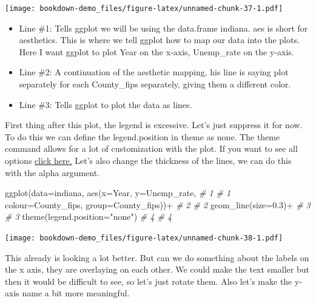 \documentclass[
]{book}
\newenvironment{Shaded}{\begin{snugshade}}{\end{snugshade}}
\newcommand{\AttributeTok}[1]{\textcolor[rgb]{0.77,0.63,0.00}{#1}}
\newcommand{\CommentTok}[1]{\textcolor[rgb]{0.56,0.35,0.01}{\textit{#1}}}
\newcommand{\FloatTok}[1]{\textcolor[rgb]{0.00,0.00,0.81}{#1}}
\newcommand{\FunctionTok}[1]{\textcolor[rgb]{0.00,0.00,0.00}{#1}}
\newcommand{\NormalTok}[1]{#1}
\newcommand{\SpecialCharTok}[1]{\textcolor[rgb]{0.00,0.00,0.00}{#1}}
\newcommand{\StringTok}[1]{\textcolor[rgb]{0.31,0.60,0.02}{#1}}
\providecommand{\tightlist}{%
  \setlength{\itemsep}{0pt}\setlength{\parskip}{0pt}}
\begin{document}
\texttt{[image: bookdown-demo\_files/figure-latex/unnamed-chunk-37-1.pdf]}

\begin{itemize}
\tightlist
\item
  Line \#1: Tells ggplot we will be using the data.frame indiana. aes is short for aesthetics. This is where we tell ggplot how to map our data into the plots. Here I want ggplot to plot Year on the x-axis, Unemp\_rate on the y-axis.
\item
  Line \#2: A continuation of the aesthetic mapping, his line is saying plot separately for each County\_fips separately, giving them a different color.
\item
  Line \#3: Tells ggplot to plot the data as lines.
\end{itemize}

First thing after this plot, the legend is excessive. Let's just suppress it for now. To do this we can define the legend.position in theme as none. The theme command allows for a lot of customization with the plot. If you want to see all options \href{https://ggplot2.tidyverse.org/reference/theme.html}{click here.} Let's also change the thickness of the lines, we can do this with the alpha argument.

\begin{Shaded}
\begin{Highlighting}[]
\FunctionTok{ggplot}\NormalTok{(}\AttributeTok{data=}\NormalTok{indiana, }\FunctionTok{aes}\NormalTok{(}\AttributeTok{x=}\NormalTok{Year, }\AttributeTok{y=}\NormalTok{Unemp\_rate,   }\CommentTok{\# 1  \# 1}
    \AttributeTok{colour=}\NormalTok{County\_fips, }\AttributeTok{group=}\NormalTok{County\_fips))}\SpecialCharTok{+}     \CommentTok{\# 2  \# 2}
  \FunctionTok{geom\_line}\NormalTok{(}\AttributeTok{size=}\FloatTok{0.3}\NormalTok{)}\SpecialCharTok{+}                           \CommentTok{\# 3  \# 3}
  \FunctionTok{theme}\NormalTok{(}\AttributeTok{legend.position=}\StringTok{"none"}\NormalTok{)                  }\CommentTok{\# 4  \# 4}
\end{Highlighting}
\end{Shaded}

\texttt{[image: bookdown-demo\_files/figure-latex/unnamed-chunk-38-1.pdf]}

This already is looking a lot better. But can we do something about the labels on the x axis, they are overlaying on each other. We could make the text smaller but then it would be difficult to see, so let's just rotate them. Also let's make the y-axis name a bit more meaningful.
\end{document}
